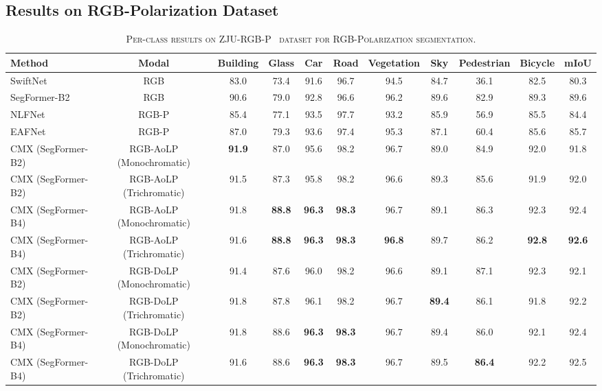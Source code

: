 \documentclass[journal]{IEEEtran}
\begin{document}
\subsection{Results on RGB-Polarization Dataset}
\label{sec:results_rgbp}

\begin{table*}[!t]
    \begin{center}
        \caption{\textsc{Per-class results on ZJU-RGB-P~\cite{xiang2021polarization} dataset for RGB-Polarization segmentation.}}
        \label{tab:per_class_rgbp}
        \begin{tabular}{ l | c |c c c c c c c c | c}
    \toprule[1pt]
    \textbf{Method} & \textbf{Modal} & {\textbf{Building}} & {\textbf{Glass}} & {\textbf{Car}} & {\textbf{Road}} & {\textbf{Vegetation}} & {\textbf{Sky}} & {\textbf{Pedestrian}} & {\textbf{Bicycle}} & \textbf{mIoU}\\
    \midrule\midrule
    SwiftNet~\cite{orsic2019swiftnet} & RGB & 83.0 & 73.4 & 91.6 & 96.7 & 94.5 & 84.7 & 36.1 & 82.5 & 80.3\\
    SegFormer-B2~\cite{xie2021segformer} & RGB & 90.6 & 79.0 & 92.8 & 96.6 & 96.2 & 89.6 & 82.9 & 89.3 & 89.6\\\midrule
    NLFNet~\cite{yan2021nlfnet} & RGB-P & 85.4 & 77.1 & 93.5 & 97.7 & 93.2 & 85.9 & 56.9 & 85.5 & 84.4\\
    EAFNet~\cite{xiang2021polarization} & RGB-P & 87.0 & 79.3 & 93.6 & 97.4 & 95.3 & 87.1 & 60.4 & 85.6 & 85.7\\ 
    \midrule
    CMX (SegFormer-B2) & RGB-AoLP (Monochromatic) & \textbf{91.9} & 87.0 & 95.6 & 98.2 & 96.7 & 89.0 & 84.9 & 92.0 & 91.8\\
    CMX (SegFormer-B2) & RGB-AoLP (Trichromatic) & 91.5 & 87.3 & 95.8 & 98.2 & 96.6 & 89.3 & 85.6 & 91.9 & 92.0\\
    CMX (SegFormer-B4) & RGB-AoLP (Monochromatic)& 91.8 & \textbf{88.8} & \textbf{96.3} & \textbf{98.3} & 96.7 & 89.1 & 86.3 & 92.3 & 92.4\\
    \rowcolor{gray!15} CMX (SegFormer-B4) & RGB-AoLP (Trichromatic) & 91.6 & \textbf{88.8} & \textbf{96.3} & \textbf{98.3} & \textbf{96.8} & 89.7 & 86.2 & \textbf{92.8} & \textbf{92.6}\\
    \midrule
    CMX (SegFormer-B2) & RGB-DoLP (Monochromatic) & 91.4 & 87.6 & 96.0 & 98.2 & 96.6 & 89.1 & 87.1 & 92.3 & 92.1\\
    CMX (SegFormer-B2) & RGB-DoLP (Trichromatic) & 91.8 & 87.8 & 96.1 & 98.2 & 96.7 & \textbf{89.4} & 86.1 & 91.8 & 92.2\\
    CMX (SegFormer-B4) & RGB-DoLP (Monochromatic) & 91.8 & 88.6 & \textbf{96.3} & \textbf{98.3} & 96.7 & 89.4 & 86.0 & 92.1 & 92.4\\
    \rowcolor{gray!15} CMX (SegFormer-B4) & RGB-DoLP (Trichromatic) & 91.6 & 88.6 & \textbf{96.3} & \textbf{98.3} & 96.7 & 89.5 & \textbf{86.4} & 92.2 & 92.5\\
    \bottomrule[1pt]
\end{tabular}     \end{center}
\end{table*}
\end{document}
